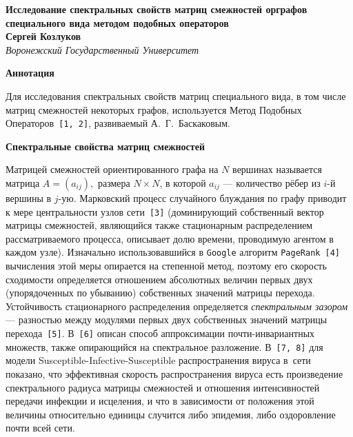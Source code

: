 \documentclass[12pt]{article}
\theoremstyle{definition}
\begin{document}

\begin{center}
    \textbf{Исследование спектральных свойств матриц
смежностей орграфов специального вида
методом подобных операторов}\\[3mm]
    \textbf{Сергей Козлуков}\\[2mm]
    \emph{Воронежский Государственный Университет}\\[2mm]
\end{center}

\smallskip\textbf{Аннотация}\smallskip

Для исследования спектральных свойств матриц специального вида,
в том числе матриц смежностей некоторых графов,
используется Метод Подобных Операторов~\texttt{[1, 2]},
развиваемый А.~Г.~Баскаковым.

\smallskip\textbf{Спектральные свойства матриц смежностей}\smallskip

Матрицей смежностей ориентированного графа на \( N \) вершинах
    называется матрица \( A=(a_{ij}), \)
    размера \( N\times N \),
    в которой \( a_{ij} \) --- количество рёбер
    из \( i \)-й вершины в \( j \)-ую.
Марковский процесс случайного блуждания по графу
    приводит к мере центральности
    узлов сети~\texttt{[3]}
    (доминирующий собственный вектор матрицы смежностей,
     являющийся также стационарным распределением
     рассматриваемого процесса,
     описывает долю времени, проводимую агентом в каждом узле).
Изначально использовавшийся в \texttt{Google}
    алгоритм \texttt{PageRank}~\texttt{[4]}
    вычисления этой меры опирается на степенной метод,
    поэтому его скорость сходимости
    определяется отношением абсолютных величин
    первых двух (упорядоченных по убыванию)
    собственных значений матрицы перехода.
Устойчивость стационарного распределения
    определяется \emph{спектральным зазором}
    --- разностью между модулями первых двух
    собственных значений матрицы перехода~\texttt{[5]}.
В~\texttt{[6]} описан способ
    аппроксимации почти-инвариантных множеств,
    также опирающийся на спектральное разложение.
В~\texttt{[7, 8]}
    для модели Susceptible-Infective-Susceptible
    распространения вируса в~сети
    показано, что эффективная скорость
    распространения вируса есть произведение
    спектрального радиуса матрицы смежностей
    и отношения интенсивностей передачи инфекции и исцеления,
    и что в зависимости от положения этой величины относительно единицы
    случится либо эпидемия, либо оздоровление почти всей сети.
\end{document}
